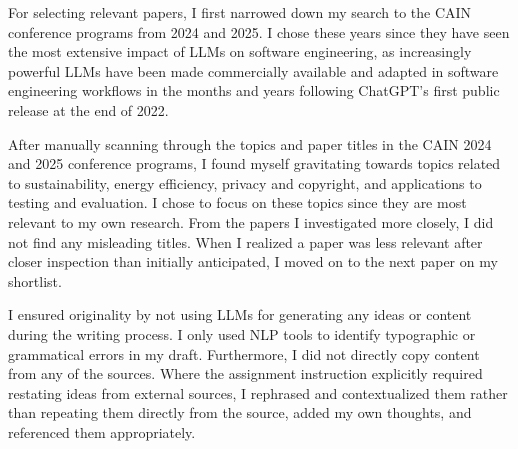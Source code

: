 \documentclass[11pt]{article}
\begin{document}
For selecting relevant papers, I first narrowed down my search to the CAIN conference programs from 2024 and 2025. I chose these years since they have seen the most extensive impact of LLMs on software engineering, as increasingly powerful LLMs have been made commercially available and adapted in software engineering workflows in the months and years following ChatGPT's first public release at the end of 2022. 

After manually scanning through the topics and paper titles in the CAIN 2024 and 2025 conference programs, I found myself gravitating towards topics related to sustainability, energy efficiency, privacy and copyright, and applications to testing and evaluation. I chose to focus on these topics since they are most relevant to my own research. From the papers I investigated more closely, I did not find any misleading titles. When I realized a paper was less relevant after closer inspection than initially anticipated, I moved on to the next paper on my shortlist.

I ensured originality by not using LLMs for generating any ideas or content during the writing process. I only used NLP tools to identify typographic or grammatical errors in my draft. Furthermore, I did not directly copy content from any of the sources. Where the assignment instruction explicitly required restating ideas from external sources, I rephrased and contextualized them rather than repeating them directly from the source, added my own thoughts, and referenced them appropriately.

\printbibliography
\end{document}
